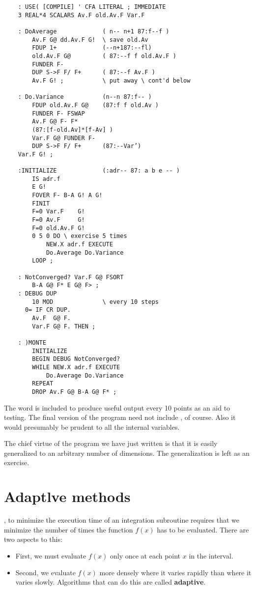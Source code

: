 \begin{lstlisting}
    : USE( [COMPILE] ' CFA LITERAL ; IMMEDIATE
    3 REAL*4 SCALARS Av.F old.Av.F Var.F

    : DoAverage             ( n-- n+1 87:f--f )
        Av.F G@ dd.Av.F G!  \ save old.Av
        FDUP 1+             (--n+187:--fl)
        old.Av.F G@         ( 87:--f f old.Av.F )
        FUNDER F-
        DUP S->F F/ F+      ( 87:--f Av.F )
        Av.F G! ;           \ put away \ cont'd below

    : Do.Variance           (n--n 87:f-- )
        FDUP old.Av.F G@    (87:f f old.Av )
        FUNDER F- FSWAP
        Av.F G@ F- F*
        (87:[f-old.Av]*[f-Av] )
        Var.F G@ FUNDER F-
        DUP S->F F/ F+      (87:--Var’)
    Var.F G! ;

    :INITIALIZE             (:adr-- 87: a b e -- )
        IS adr.f
        E G!
        FOVER F- B-A G! A G!
        FINIT
        F=0 Var.F    G!
        F=0 Av.F     G!
        F=0 old.Av.F G!
        0 5 0 DO \ exercise 5 times
            NEW.X adr.f EXECUTE
            Do.Average Do.Variance
        LOOP ;

    : NotConverged? Var.F G@ FSORT
        B-A G@ F* E G@ F> ;
    : DEBUG DUP
        10 MOD              \ every 10 steps
      0= IF CR DUP.
        Av.F  G@ F.
        Var.F G@ F. THEN ;

    : )MONTE
        INITIALIZE
        BEGIN DEBUG NotConverged?
        WHILE NEW.X adr.f EXECUTE
            Do.Average Do.Variance
        REPEAT
        DROP Av.F G@ B-A G@ F* ;
\end{lstlisting}

The word  is included to produce useful output every 10 points as an aid to testing. The final version of the program need not include , of course. Also it would presumably be prudent to  all the internal variables.

The chief virtue of the program we have just written is that it is easily generalized to an arbitrary number of dimensions. The generalization is left as an exercise.

\section{Adaptlve methods}
, to minimize the execution time of an integration subroutine requires that we minimize the number of times the function $f(x)$ has to be evaluated. There are two aspects to this:
\begin{itemize}
    \item First, we must evaluate $f(x)$ only once at each point $x$ in the interval.
    \item Second, we evaluate $f(x)$ more densely where it varies rapidly than where it varies slowly. Algorithms that can do this are called \textbf{adaptive}.
\end{itemize}

